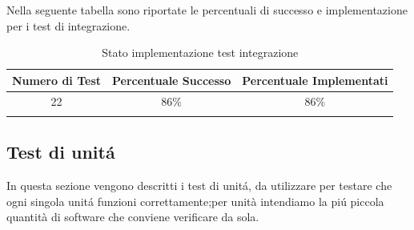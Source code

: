 \documentclass[../PianoDiQualifica.tex]{subfiles}
\begin{document}
Nella seguente tabella sono riportate le percentuali di successo e implementazione per i test di integrazione.
\normalsize
\begin{longtable}{|c|c|c|}
	\hline
	\textbf{Numero di Test} & \textbf{Percentuale Successo} & \textbf{Percentuale Implementati}\\
	\hline
	\endhead
	22 & 86\% & 86\%\\
	\hline
	\caption[Stato implementazione test integrazione]{Stato implementazione test integrazione}
	\label{tabella:Stato implementazione test integrazione}
\end{longtable}
	
		\newpage
		\subsection{Test di unit\'a} 
		In questa sezione vengono descritti i test di unit\'a, da utilizzare per testare che ogni singola unit\'a funzioni correttamente;per unità intendiamo la pi\'u piccola quantità di software che conviene verificare da sola.
		
\end{document}
